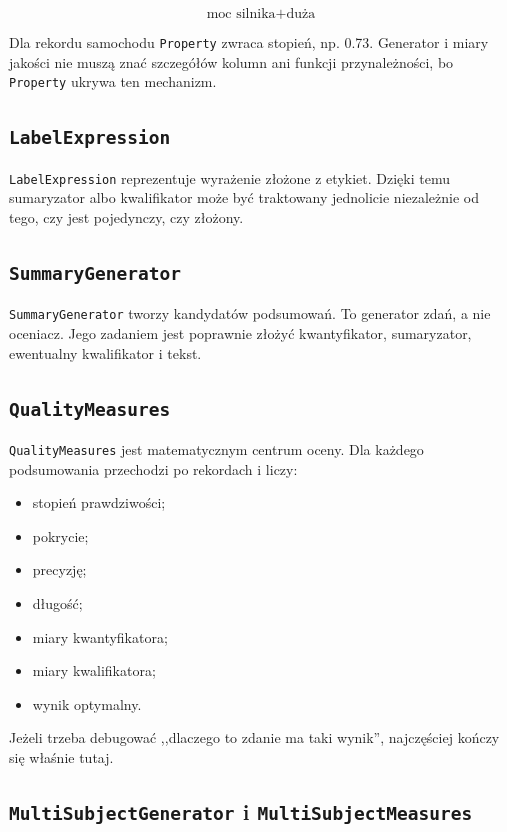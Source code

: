\documentclass[11pt,a4paper]{article}
\newcommand{\code}[1]{\texttt{#1}}
\begin{document}
\[
\text{moc silnika} + \text{duża}
\]

Dla rekordu samochodu \code{Property} zwraca stopień, np. 0.73. Generator i miary jakości nie muszą znać szczegółów kolumn ani funkcji przynależności, bo \code{Property} ukrywa ten mechanizm.

\subsection{\code{LabelExpression}}

\code{LabelExpression} reprezentuje wyrażenie złożone z etykiet. Dzięki temu sumaryzator albo kwalifikator może być traktowany jednolicie niezależnie od tego, czy jest pojedynczy, czy złożony.

\subsection{\code{SummaryGenerator}}

\code{SummaryGenerator} tworzy kandydatów podsumowań. To generator zdań, a nie oceniacz. Jego zadaniem jest poprawnie złożyć kwantyfikator, sumaryzator, ewentualny kwalifikator i tekst.

\subsection{\code{QualityMeasures}}

\code{QualityMeasures} jest matematycznym centrum oceny. Dla każdego podsumowania przechodzi po rekordach i liczy:

\begin{itemize}
    \item stopień prawdziwości;
    \item pokrycie;
    \item precyzję;
    \item długość;
    \item miary kwantyfikatora;
    \item miary kwalifikatora;
    \item wynik optymalny.
\end{itemize}

Jeżeli trzeba debugować ,,dlaczego to zdanie ma taki wynik'', najczęściej kończy się właśnie tutaj.

\subsection{\code{MultiSubjectGenerator} i \code{MultiSubjectMeasures}}
\end{document}
